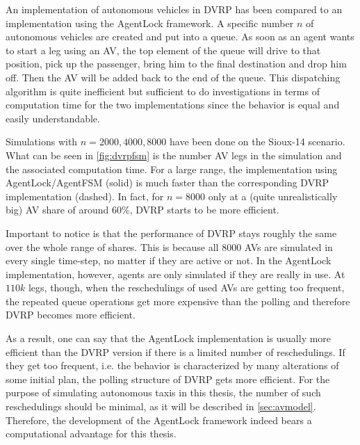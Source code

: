 An implementation of autonomous vehicles in DVRP has been compared to an implementation
using the AgentLock framework. A specific number $n$ of
autonomous vehicles are created and put into a queue. As soon as an agent wants to
start a leg using an AV, the top element of the queue will drive to that position,
pick up the passenger, bring him to the final destination and drop him off. Then
the AV will be added back to the end of the queue. This dispatching algorithm is
quite inefficient but sufficient to do investigations in terms
of computation time for the two implementations since the behavior is equal and
easily understandable.

Simulations with $n=2000, 4000, 8000$ have been done on the Sioux-14 scenario. What can be seen in \cref{fig:dvrpfsm}
is the number AV legs in the simulation and the associated computation
time. For a large range, the implementation using AgentLock/AgentFSM (solid)
is much faster than the corresponding DVRP implementation (dashed). In fact, for $n=8000$
only at a (quite unrealistically big) AV share of around 60\%, DVRP starts to be more efficient.

Important to notice is that the performance of DVRP stays roughly the same over
the whole range of shares. This is because all 8000 AVs are simulated
in every single time-step, no matter if they are active or not. In the AgentLock
implementation, however, agents are only simulated if they are really in use. At
$110k$ legs, though, when the reschedulings of used AVs are getting too frequent, the repeated
queue operations get more expensive than the polling and therefore DVRP becomes more efficient.

As a result, one can say that the AgentLock implementation is usually more efficient
than the DVRP version if there is a limited number of reschedulings. If they get
too frequent, i.e. the behavior is characterized by many alterations of some
initial plan, the polling structure of DVRP gets more efficient. For the purpose
of simulating autonomous taxis in this thesis, the number of such reschedulings
should be minimal, as it will be described in \cref{sec:avmodel}. Therefore, the
development of the AgentLock framework indeed bears a computational advantage for
this thesis.

